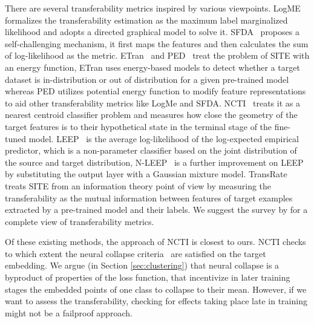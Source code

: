 There are several transferability metrics inspired by various viewpoints. LogME~\cite{logme} formalizes the transferability
estimation as the maximum label marginalized likelihood
and adopts a directed graphical model to solve it. SFDA~\cite{SFDA} proposes a self-challenging mechanism, it first maps the features and then calculates the sum of log-likelihood as the metric.  ETran~\cite{ETran} and PED~\cite{PED} treat the problem of SITE with an energy function, ETran uses energy-based models to detect whether a target dataset is in-distribution or out of distribution for a given pre-trained model whereas PED utilizes potential energy function to modify feature representations to aid other transferability metrics like LogMe and SFDA. NCTI~\cite{NCTI} treats it as a nearest centroid classifier problem and measures how close the geometry of the target features is to their hypothetical state in the
terminal stage of the fine-tuned model. LEEP~\cite{leep} is the average log-likelihood of the log-expected empirical predictor, which is a non-parameter classifier based on the joint distribution of the source and target distribution, N-LEEP~\cite{NLEEP} is a further improvement on LEEP by substituting the output layer with a Gaussian
mixture model. TransRate~\cite{TransRate} treats SITE from an information theory point of view by measuring the transferability as the mutual information between features of target examples extracted by a pre-trained model and their labels. We suggest the survey by \citet{ding2024modeltransfersurveytransferability} for a complete view of transferability metrics. 

Of these existing methods, the approach of NCTI is closest to ours. NCTI checks to which extent the neural collapse criteria~\cite{neuralcollapse} are satisfied on the target embedding. %
We argue (in Section \ref{sec:clustering}) that neural collapse is a byproduct of properties of the loss function, that incentivize in later training stages the embedded points of one class to collapse to their mean. However, if we want to assess the transferability, checking for effects taking place late in training might not be a failproof approach.